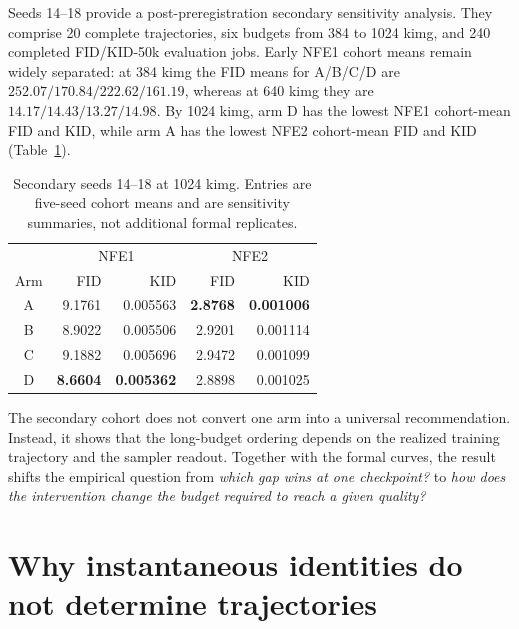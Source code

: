 \documentclass{article}
\newif\ifshowcomments
\newcommand{\empnote}[1]{%
  \ifshowcomments{\color{empiricalgreen}\textbf{[EMPIRICAL CHECK: #1]}}\fi}
\begin{document}
Seeds 14--18 provide a post-preregistration secondary sensitivity analysis.
They comprise 20 complete trajectories, six budgets from 384 to 1024 kimg, and
240 completed FID/KID-50k evaluation jobs. Early NFE1 cohort means remain
widely separated: at 384 kimg the FID means for A/B/C/D are
$252.07/170.84/222.62/161.19$, whereas at 640 kimg they are
$14.17/14.43/13.27/14.98$. By 1024 kimg, arm D has the lowest NFE1 cohort-mean
FID and KID, while arm A has the lowest NFE2 cohort-mean FID and KID
(Table~\ref{tab:secondary-1024}).

\begin{table}[t]
  \caption{Secondary seeds 14--18 at 1024 kimg. Entries are five-seed cohort
  means and are sensitivity summaries, not additional formal replicates.}
  \label{tab:secondary-1024}
  \centering
  \small
  \begin{tabular}{crrrr}
    \toprule
    & \multicolumn{2}{c}{NFE1} & \multicolumn{2}{c}{NFE2} \\
    \cmidrule(lr){2-3}\cmidrule(lr){4-5}
    Arm & FID & KID & FID & KID \\
    \midrule
    A & 9.1761 & 0.005563 & \textbf{2.8768} & \textbf{0.001006} \\
    B & 8.9022 & 0.005506 & 2.9201 & 0.001114 \\
    C & 9.1882 & 0.005696 & 2.9472 & 0.001099 \\
    D & \textbf{8.6604} & \textbf{0.005362} & 2.8898 & 0.001025 \\
    \bottomrule
  \end{tabular}
\end{table}

The secondary cohort does not convert one arm into a universal recommendation.
Instead, it shows that the long-budget ordering depends on the realized
training trajectory and the sampler readout. Together with the formal curves,
the result shifts the empirical question from
\emph{which gap wins at one checkpoint?} to
\emph{how does the intervention change the budget required to reach a given
quality?}

\empnote{Figure 3: predefine log-FID AUC and time-to-quality only for the new
prospectively frozen cohort. Existing curves can illustrate these quantities
but must not be retroactively labeled confirmatory.}

\section{Why instantaneous identities do not determine trajectories}
\label{sec:stateful-trajectories}
\end{document}
